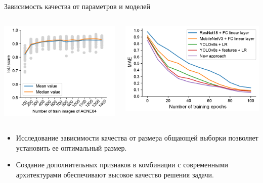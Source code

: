 \documentclass[12pt,pdf,hyperref={unicode}]{beamer}
\begin{document}
\begin{frame}{Зависимость качества от параметров и моделей}
\begin{columns}
\begin{column}{0.5\textwidth}
    \includegraphics[width=1\textwidth]{Holicheva-Step-10-fig-1}
\end{column}
\begin{column}{0.5\textwidth}
	\includegraphics[width=1\textwidth]{Holicheva-Step-10-fig-2}      
\end{column}
\end{columns}
\begin{itemize}
    \item Исследование зависимости качества от размера общающей выборки позволяет установить ее оптимальный размер.
    \item Создание дополнительных признаков в комбинации с современными архитектурами обеспечивают высокое качество решения задачи.
\end{itemize}
\end{frame}
\end{document}
